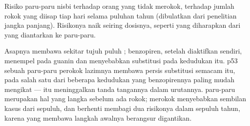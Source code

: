 \begin{omfigure}

{\small Risiko  paru-paru nisbi terhadap orang yang tidak
merokok, terhadap jumlah rokok yang diisap tiap hari selama puluhan
tahun (dibulatkan dari penelitian jangka panjang). Risikonya naik
seiring dosisnya, seperti yang diharapkan dari  yang diantarkan
ke paru-paru.}
\end{omfigure}

\begin{example}[Tembakau]\label{ex:g11:cancer:tobacco}
Asapnya membawa sekitar tujuh puluh ; benzopiren, setelah
diaktifkan   sendiri, menempel pada guanin dan menyebabkan
substitusi pada kedudukan itu.  p53 sebuah  paru-paru perokok
lazimnya membawa persis substitusi semacam itu, pada salah satu dari
beberapa kedudukan yang benzopirennya paling mudah mengikat --- 
itu meninggalkan tanda tangannya dalam urutannya.  paru-paru
merupakan hal yang langka sebelum ada rokok; merokok menyebabkan
sembilan kasus dari sepuluh, dan berhenti membagi dua risikonya dalam
sepuluh tahun, karena  yang membawa langkah awalnya berangsur digantikan.
\end{example}

